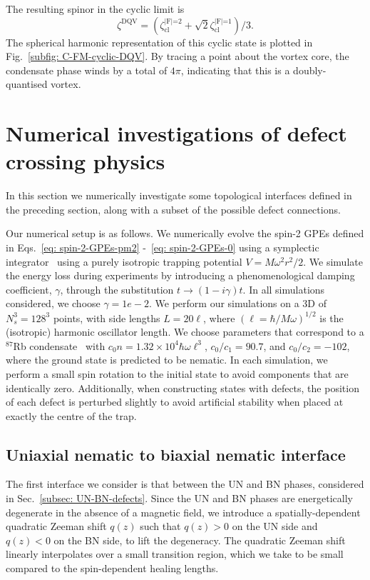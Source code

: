 The resulting spinor in the cyclic limit is
\begin{equation}\label{eq: C-FM-DQV-cyclic-limit}
    \zeta^\text{DQV}
    = \left(\zeta^\text{|F|=2}_\text{cl}
    + \sqrt{2}\zeta^\text{|F|=1}_\text{cl}\right) / 3.
\end{equation}
The spherical harmonic representation of this cyclic state is plotted in
Fig.~\ref{subfig: C-FM-cyclic-DQV}.
By tracing a point about the vortex core, the condensate phase winds by a total
of \(4\pi \), indicating that this is a doubly-quantised vortex.

\section{Numerical investigations of defect crossing physics}
In this section we numerically investigate some topological interfaces defined
in the preceding section, along with a subset of the possible defect
connections.

Our numerical setup is as follows.
We numerically evolve the spin-2 GPEs defined in
Eqs.~\eqref{eq: spin-2-GPEs-pm2} -~\eqref{eq: spin-2-GPEs-0} using a symplectic
integrator~\cite{SymesNumeric2017} using a purely isotropic trapping potential
\(V=M\omega^2r^2/2\).
We simulate the energy loss during experiments by introducing a phenomenological
damping coefficient, \(\gamma \), through the substitution
\(t \rightarrow (1-i\gamma)t\).
In all simulations considered, we choose \(\gamma = 1e-2\).
We perform our simulations on a 3D of \(N_s^3=128^3\) points, with side lengths
\(L = 20\ell \), where \({(\ell =\hbar/M\omega)}^{1/2}\) is the (isotropic)
harmonic oscillator length.
We choose parameters that correspond to a \(^{87}\)Rb
condensate~\cite{Klausen2001} with \(c_0n=1.32\times10^4\hbar\omega\ell^3\),
\(c_0/c_1=90.7\), and \(c_0/c_2=-102\), where the ground state is predicted to
be nematic.
In each simulation, we perform a small spin rotation to the initial state to
avoid components that are identically zero.
Additionally, when constructing states with defects, the position of each defect
is perturbed slightly to avoid artificial stability when placed at exactly the
centre of the trap.


\subsection{Uniaxial nematic to biaxial nematic interface}
The first interface we consider is that between the UN and BN phases, considered
in Sec.~\ref{subsec: UN-BN-defects}.
Since the UN and BN phases are energetically degenerate in the absence of a
magnetic field, we introduce a spatially-dependent quadratic Zeeman shift
\(q(z)\) such that \(q(z) > 0\) on the UN side and \(q(z) < 0\) on the BN side,
to lift the degeneracy.
The quadratic Zeeman shift linearly interpolates over a small transition region,
which we take to be small compared to the spin-dependent healing lengths.


